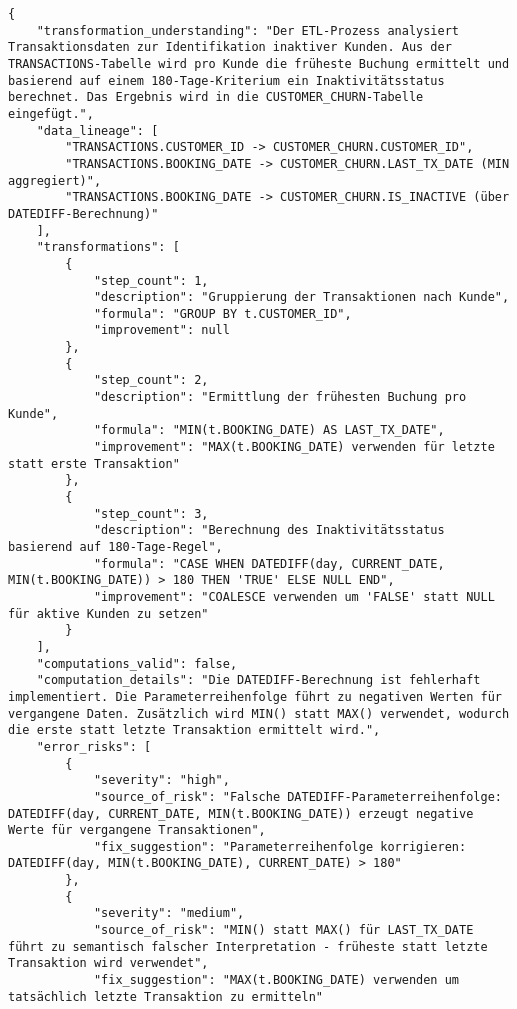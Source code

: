 \begin{lstlisting}[caption={Ausgabe: Claude Sonnet 4 Anwendungsfall 7 Hauptdurchlauf},label={claude_case7_prompt1}]
{
    "transformation_understanding": "Der ETL-Prozess analysiert Transaktionsdaten zur Identifikation inaktiver Kunden. Aus der TRANSACTIONS-Tabelle wird pro Kunde die früheste Buchung ermittelt und basierend auf einem 180-Tage-Kriterium ein Inaktivitätsstatus berechnet. Das Ergebnis wird in die CUSTOMER_CHURN-Tabelle eingefügt.",
    "data_lineage": [
        "TRANSACTIONS.CUSTOMER_ID -> CUSTOMER_CHURN.CUSTOMER_ID",
        "TRANSACTIONS.BOOKING_DATE -> CUSTOMER_CHURN.LAST_TX_DATE (MIN aggregiert)",
        "TRANSACTIONS.BOOKING_DATE -> CUSTOMER_CHURN.IS_INACTIVE (über DATEDIFF-Berechnung)"
    ],
    "transformations": [
        {
            "step_count": 1,
            "description": "Gruppierung der Transaktionen nach Kunde",
            "formula": "GROUP BY t.CUSTOMER_ID",
            "improvement": null
        },
        {
            "step_count": 2,
            "description": "Ermittlung der frühesten Buchung pro Kunde",
            "formula": "MIN(t.BOOKING_DATE) AS LAST_TX_DATE",
            "improvement": "MAX(t.BOOKING_DATE) verwenden für letzte statt erste Transaktion"
        },
        {
            "step_count": 3,
            "description": "Berechnung des Inaktivitätsstatus basierend auf 180-Tage-Regel",
            "formula": "CASE WHEN DATEDIFF(day, CURRENT_DATE, MIN(t.BOOKING_DATE)) > 180 THEN 'TRUE' ELSE NULL END",
            "improvement": "COALESCE verwenden um 'FALSE' statt NULL für aktive Kunden zu setzen"
        }
    ],
    "computations_valid": false,
    "computation_details": "Die DATEDIFF-Berechnung ist fehlerhaft implementiert. Die Parameterreihenfolge führt zu negativen Werten für vergangene Daten. Zusätzlich wird MIN() statt MAX() verwendet, wodurch die erste statt letzte Transaktion ermittelt wird.",
    "error_risks": [
        {
            "severity": "high",
            "source_of_risk": "Falsche DATEDIFF-Parameterreihenfolge: DATEDIFF(day, CURRENT_DATE, MIN(t.BOOKING_DATE)) erzeugt negative Werte für vergangene Transaktionen",
            "fix_suggestion": "Parameterreihenfolge korrigieren: DATEDIFF(day, MIN(t.BOOKING_DATE), CURRENT_DATE) > 180"
        },
        {
            "severity": "medium",
            "source_of_risk": "MIN() statt MAX() für LAST_TX_DATE führt zu semantisch falscher Interpretation - früheste statt letzte Transaktion wird verwendet",
            "fix_suggestion": "MAX(t.BOOKING_DATE) verwenden um tatsächlich letzte Transaktion zu ermitteln"

\end{lstlisting}
